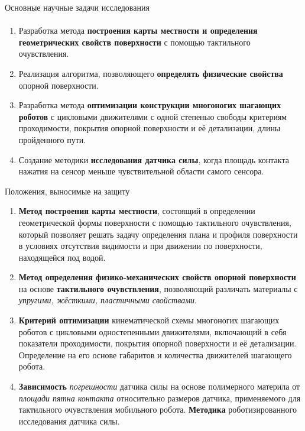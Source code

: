\begin{frame}[t]{Основные научные задачи исследования}
    \framesubtitle{}
    \begin{enumerate}
        \item  Разработка метода \textbf{построения карты местности и определения геометрических свойств поверхности} с помощью тактильного очувствления.
        \item Реализация алгоритма, позволяющего \textbf{определять физические свойства} опорной поверхности.
        \item Разработка метода \textbf{оптимизации конструкции многоногих шагающих роботов} с цикловыми движителями с одной степенью свободы критериям проходимости, покрытия опорной поверхности и её детализации, длины пройденного пути.
        \item Создание методики \textbf{исследования датчика силы}, когда площадь контакта нажатия на сенсор меньше чувствительной области самого сенсора.
    \end{enumerate}
\end{frame}



\begin{frame}{Положения, выносимые на защиту}
    \begin{enumerate}
        \vspace{-0.3cm}
        \small
        \item \textbf{Метод построения карты местности}, состоящий в определении геометрической формы поверхности с помощью тактильного очувствления, который позволяет решать задачу определения плана и профиля поверхности в условиях отсутствия видимости и при движении по поверхности, находящейся под водой.
        \item \textbf{Метод определения физико-механических свойств опорной поверхности} на основе \textbf{тактильного очувствления}, позволяющий различать материалы с \textit{упругими, жёсткими, пластичными свойствами}.
        \item \textbf{Критерий оптимизации} кинематической схемы многоногих шагающих роботов с цикловыми одностепенными движителями, включающий в себя показатели проходимости, покрытия опорной поверхности и её детализации. Определение на его основе габаритов и количества движителей шагающего робота.
        \item \textbf{Зависимость} \textit{погрешности} датчика силы на основе полимерного материла от \textit{площади пятна контакта} относительно размеров датчика, применяемого для тактильного очувствления мобильного робота. \textbf{Методика} роботизированного исследования датчика силы.
    \end{enumerate}
\end{frame}


